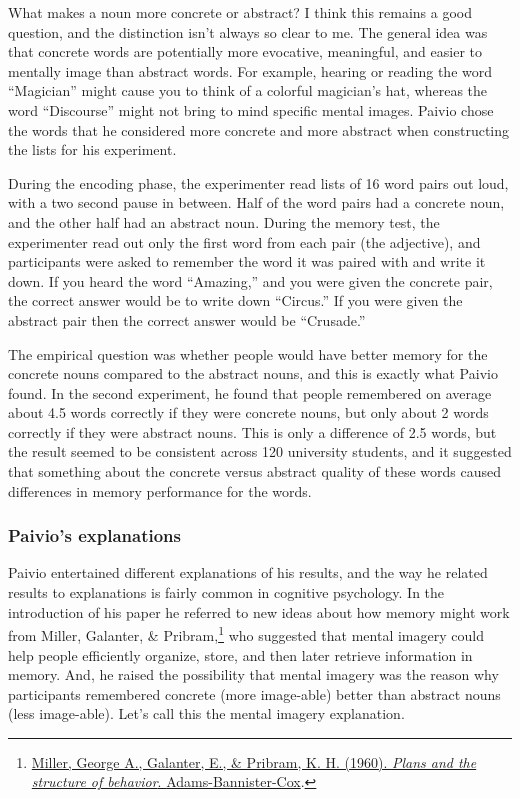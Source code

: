 \documentclass[
  oneside,
  12pt]{crumpbook}
\begin{document}
What makes a noun more concrete or abstract? I think this remains a good question, and the distinction isn't always so clear to me. The general idea was that concrete words are potentially more evocative, meaningful, and easier to mentally image than abstract words. For example, hearing or reading the word ``Magician'' might cause you to think of a colorful magician's hat, whereas the word ``Discourse'' might not bring to mind specific mental images. Paivio chose the words that he considered more concrete and more abstract when constructing the lists for his experiment.

During the encoding phase, the experimenter read lists of 16 word pairs out loud, with a two second pause in between. Half of the word pairs had a concrete noun, and the other half had an abstract noun. During the memory test, the experimenter read out only the first word from each pair (the adjective), and participants were asked to remember the word it was paired with and write it down. If you heard the word ``Amazing,'' and you were given the concrete pair, the correct answer would be to write down ``Circus.'' If you were given the abstract pair then the correct answer would be ``Crusade.''

The empirical question was whether people would have better memory for the concrete nouns compared to the abstract nouns, and this is exactly what Paivio found. In the second experiment, he found that people remembered on average about 4.5 words correctly if they were concrete nouns, but only about 2 words correctly if they were abstract nouns. This is only a difference of 2.5 words, but the result seemed to be consistent across 120 university students, and it suggested that something about the concrete versus abstract quality of these words caused differences in memory performance for the words.

\hypertarget{paivios-explanations}{%
\subsubsection{Paivio's explanations}\label{paivios-explanations}}

Paivio entertained different explanations of his results, and the way he related results to explanations is fairly common in cognitive psychology. In the introduction of his paper he referred to new ideas about how memory might work from Miller, Galanter, \& Pribram,\footnote{\protect\hyperlink{ref-millerPlansStructureBehavior1960}{Miller, George A., Galanter, E., \& Pribram, K. H. (1960). \emph{Plans and the structure of behavior}. {Adams-Bannister-Cox}}.} who suggested that mental imagery could help people efficiently organize, store, and then later retrieve information in memory. And, he raised the possibility that mental imagery was the reason why participants remembered concrete (more image-able) better than abstract nouns (less image-able). Let's call this the mental imagery explanation.
\end{document}
